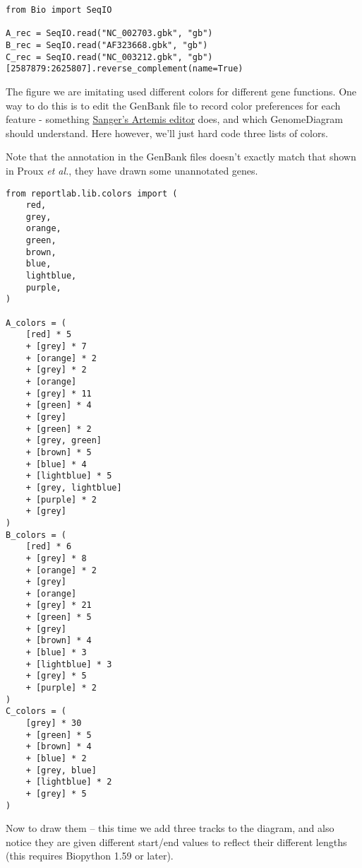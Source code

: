 \begin{verbatim}
from Bio import SeqIO

A_rec = SeqIO.read("NC_002703.gbk", "gb")
B_rec = SeqIO.read("AF323668.gbk", "gb")
C_rec = SeqIO.read("NC_003212.gbk", "gb")[2587879:2625807].reverse_complement(name=True)
\end{verbatim}

The figure we are imitating used different colors for different gene functions.
One way to do this is to edit the GenBank file to record color preferences for
each feature - something \href{https://www.sanger.ac.uk/science/tools/artemis}
{Sanger's Artemis editor} does, and which GenomeDiagram should understand. Here
however, we'll just hard code three lists of colors.

Note that the annotation in the GenBank files doesn't exactly match that shown
in Proux \textit{et al.}, they have drawn some unannotated genes.

\begin{verbatim}
from reportlab.lib.colors import (
    red,
    grey,
    orange,
    green,
    brown,
    blue,
    lightblue,
    purple,
)

A_colors = (
    [red] * 5
    + [grey] * 7
    + [orange] * 2
    + [grey] * 2
    + [orange]
    + [grey] * 11
    + [green] * 4
    + [grey]
    + [green] * 2
    + [grey, green]
    + [brown] * 5
    + [blue] * 4
    + [lightblue] * 5
    + [grey, lightblue]
    + [purple] * 2
    + [grey]
)
B_colors = (
    [red] * 6
    + [grey] * 8
    + [orange] * 2
    + [grey]
    + [orange]
    + [grey] * 21
    + [green] * 5
    + [grey]
    + [brown] * 4
    + [blue] * 3
    + [lightblue] * 3
    + [grey] * 5
    + [purple] * 2
)
C_colors = (
    [grey] * 30
    + [green] * 5
    + [brown] * 4
    + [blue] * 2
    + [grey, blue]
    + [lightblue] * 2
    + [grey] * 5
)
\end{verbatim}

Now to draw them -- this time we add three tracks to the diagram, and also notice they
are given different start/end values to reflect their different lengths (this requires
Biopython 1.59 or later).


